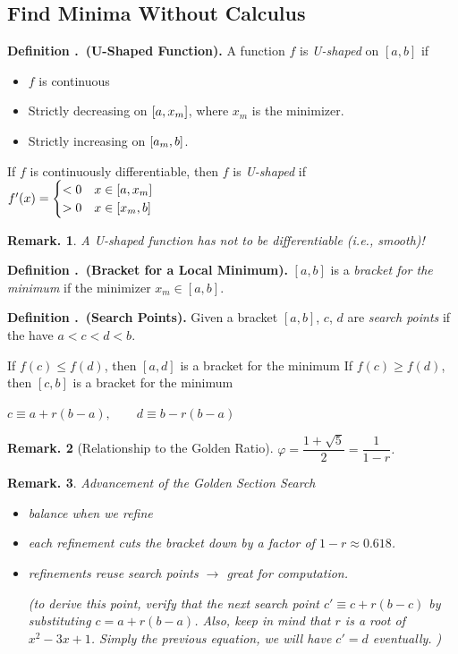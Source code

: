 \documentclass[12pt, a4paper]{article}
\newcounter{index}[subsection]
\newenvironment*{df}[1]{\par\noindent\textbf{Definition \thesubsection.\stepcounter{index}\theindex\ (#1).}}{\par}
\newtheorem{rmk}{Remark.}[section]
\def\phi{\varphi}
\begin{document}
\subsection{Find Minima Without Calculus}
\begin{df}{U-Shaped Function}
	A function $f$ is \textit{U-shaped} on $[a,b]$ if 
	\begin{itemize}
		\item $f$ is continuous
		\item Strictly decreasing on $\qty[a,x_m]$, where $x_m$ is the minimizer.
		\item Strictly increasing on $\qty[a_m,b]$.
	\end{itemize}
	If $f$ is continuously differentiable, then $f$ is \textit{U-shaped} if $f'(x)=\begin{cases}<0\quad x\in\qty[a,x_m]\\>0\quad x\in\qty[x_m,b]\end{cases}$
\end{df}
\begin{rmk}
	A U-shaped function has not to be differentiable (i.e., smooth)!	
\end{rmk}
\begin{df}{Bracket for a Local Minimum}
	$[a,b]$ is a \textit{bracket for the minimum} if the minimizer $x_m\in[a,b]$.	
\end{df}
\begin{df}{Search Points}
	Given a bracket $[a,b]$, $c$, $d$ are \textit{search points} if the have $a<c<d<b$.
\end{df}
\begin{algorithm}
	\caption{Bracket Refinement}
	If $f(c)\leq f(d)$, then $[a,d]$ is a bracket for the minimum\;
	If $f(c)\geq f(d)$, then $[c,b]$ is a bracket for the minimum\;
\end{algorithm}
\begin{algorithm}
	\caption{Golden Section Search}
	$c\equiv a+r(b-a),\qquad d\equiv b-r(b-a)$\;	
\end{algorithm}
\begin{rmk}[Relationship to the Golden Ratio]
	 $\phi=\dfrac{1+\sqrt{5}}{2}=\dfrac{1}{1-r}$.	
\end{rmk}
\begin{rmk}
Advancement of the Golden Section Search
	\begin{itemize}
		\item balance when we refine
		\item each refinement cuts the bracket down by a factor of $1-r\approx0.618$.
		\item refinements reuse search points $\longrightarrow$ great for computation. \par (to derive this point, verify that the next search point $c'\equiv c+r(b-c)$ by substituting $c=a+r(b-a)$. Also, keep in mind that $r$ is a root of $x^2-3x+1$. Simply the previous equation, we will have $c'=d$ eventually. )
	\end{itemize}
\end{rmk}
\end{document}
